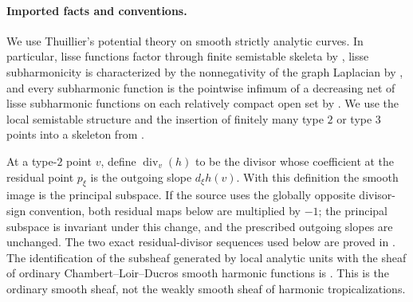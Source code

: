 
\paragraph{Imported facts and conventions.}
We use Thuillier's potential theory on smooth strictly analytic curves.
In particular, lisse functions factor through finite semistable skeleta by
\cite[Proposition~3.2.4]{Thu05}, lisse subharmonicity is characterized by
the nonnegativity of the graph Laplacian by
\cite[Proposition~3.4.4]{Thu05}, and every subharmonic function is the
pointwise infimum of a decreasing net of lisse subharmonic functions on
each relatively compact open set by \cite[Theorem~3.4.2]{Thu05}.  We use
the local semistable structure and the insertion of finitely many type
$2$ or type $3$ points into a skeleton from
\cite[\S2.2.3 and Lemma~2.2.22(ii)]{Thu05}.

At a type-$2$ point \(v\), define \(\operatorname{div}_v(h)\) to be the
divisor whose coefficient at the residual point \(p_\xi\) is the outgoing
slope \(d_\xi h(v)\).  With this definition the smooth image is the
principal subspace.  If the source uses the globally opposite divisor-sign
convention, both residual maps below are multiplied by \(-1\); the
principal subspace is invariant under this change, and the prescribed
outgoing slopes are unchanged.  The two exact residual-divisor sequences
used below are proved in \cite[Lemma~2.3.22]{Thu05}.  The identification of the
subsheaf generated by local analytic units with the sheaf of ordinary
Chambert--Loir--Ducros smooth harmonic functions is
\cite[Remark~15.10]{GJR26}.  This is the ordinary smooth sheaf, not the
weakly smooth sheaf of harmonic tropicalizations.

